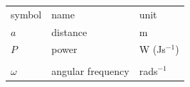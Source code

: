 

\begin{tabular}{lll}
	symbol & name & unit \\
	$a$ & distance & m \\
	$P$ & power & W (Js$^{-1}$) \\
	& & \\
	$\omega$ & angular frequency & rads$^{-1}$ \\
\end{tabular}
\clearpage
